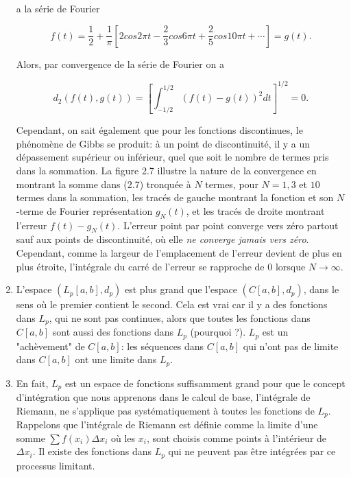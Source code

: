 \documentclass[10pt,twoside,a4paper]{book}
\begin{document}
\begin{enumerate}


  \noindent
  a la série de Fourier

  \begin{equation}
    f(t) = \frac{1}{2} + \frac{1}{\pi}  \left[2cos2\pi t - \frac{2}{3}cos6\pi t + \frac{2}{5}cos10\pi t + \cdots \right] = g(t).
  \end{equation}

  \noindent
  Alors, par convergence de la série de Fourier on a

  \begin{equation*}
    d_2(f(t), g(t)) = \left[ \int_{-1/2}^{1/2} (f(t) - g(t))^2dt \right]^{1/2} = 0.
  \end{equation*}

  \noindent
  Cependant, on sait également que pour les fonctions discontinues, le phénomène de Gibbs se produit: à un point de discontinuité, il y a un dépassement supérieur ou inférieur, quel que soit le nombre de termes pris dans la sommation. 
  La figure 2.7 illustre la nature de la convergence en montrant la somme dans (2.7) tronquée à $N$ termes, pour $N = 1, 3$ et $10$ termes dans la sommation, les tracés de gauche montrant la fonction et son $N$-terme de Fourier représentation $g_N(t)$, 
  et les tracés de droite montrant l'erreur $f(t) - g_N(t)$. L'erreur point par point converge vers zéro partout sauf aux points de discontinuité, où elle \textit{ne converge jamais vers zéro}. 
  Cependant, comme la largeur de l'emplacement de l'erreur devient de plus en plus étroite, l'intégrale du carré de l'erreur se rapproche de 0 lorsque $N \longrightarrow \infty$.

  \item L'espace $(L_p[a, b], d_p)$ est plus grand que l'espace $(C[a, b], d_p)$, dans le sens où le premier contient le second. Cela est vrai car il y a des fonctions dans $L_p$, qui ne sont pas continues, alors que toutes les fonctions dans $C[a, b]$ sont aussi des fonctions dans $L_p$ (pourquoi ?). 
  $L_p$ est un "achèvement" de $C[a, b]$: les séquences dans $C[a, b]$ qui n'ont pas de limite dans $C[a, b]$ ont une limite dans $L_p$.

  \item En fait, $L_p$ est un espace de fonctions suffisamment grand pour que le concept d'intégration que nous apprenons dans le calcul de base, l'intégrale de Riemann, ne s'applique pas systématiquement à toutes les fonctions de $L_p$. Rappelons que l'intégrale de Riemann est définie comme la limite d'une somme 
  $\sum f(x_i) \Delta x_i$ où les $x_i$, sont choisis comme points à l'intérieur de $\Delta x_i$. Il existe des fonctions dans $L_p$ qui ne peuvent pas être intégrées par ce processus limitant.


\end{enumerate}
\end{document}
